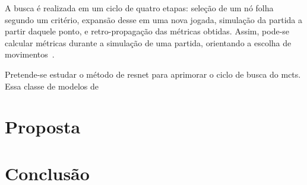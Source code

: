 \documentclass[12pt]{article}
\begin{document}
A busca é realizada em um ciclo de quatro etapas: seleção de um nó folha segundo um critério, expansão desse em uma nova jogada, simulação da partida a partir daquele ponto, e retro-propagação das métricas obtidas.
Assim, pode-se calcular métricas durante a simulação de uma partida, orientando a escolha de movimentos~\cite{mcts-swiechowski}.

Pretende-se estudar o método de \gls{resnet} para aprimorar o ciclo de busca do \gls{mcts}.
Essa classe de modelos de 

\section{Proposta}%
\label{sec:proposta}


\section{Conclusão}%
\label{sec:conclusao}


\printbibliography{}
\end{document}
